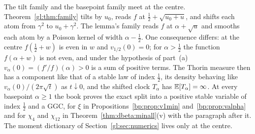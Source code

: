 The tilt family and the basepoint family meet at the centre. Theorem~\ref{gl:thm:family} tilts by $u_0$, reads $f$ at $\tfrac12+\sqrt{u_0+u}$, and shifts each atom from $\gamma^2$ to $u_0+\gamma^2$. The lemma's family reads $f$ at $\alpha+\sqrt u$ and smooths each atom by a Poisson kernel of width $\alpha-\tfrac12$. One consequence differs: at the centre $f(\tfrac12+w)$ is even in $w$ and $v_{1/2}(0)=0$; for $\alpha>\tfrac12$ the function $f(\alpha+w)$ is not even, and under the hypothesis of part~(a) $v_\alpha(0)=(f'/f)(\alpha)>0$ is a sum of positive terms. The Thorin measure then has a component like that of a stable law of index $\tfrac12$, its density behaving like $v_\alpha(0)/(2\pi\sqrt t)$ as $t\downarrow0$, and the shifted clock $T_\alpha$ has $\mathbb{E}[T_\alpha]=\infty$. At every basepoint $\alpha\ge1$ the book proves the exact split into a positive stable variable of index $\tfrac12$ and a GGC, for $\xi$ in Propositions~\ref{bp:prop:v1min} and~\ref{bp:prop:valpha} and for $\chi_4$ and $\chi_{12}$ in Theorem~\ref{thm:dbeta:minall}(v) with the paragraph after it. The moment dictionary of Section~\ref{gl:sec:numerics} lives only at the centre.


